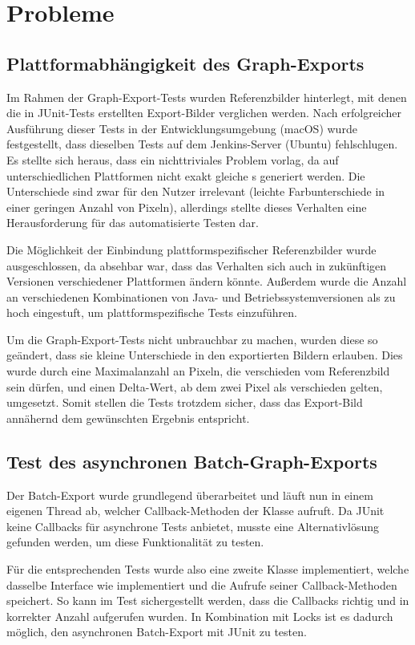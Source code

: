 \newpage
\section{Probleme}

\subsection{Plattformabhängigkeit des Graph-Exports}

Im Rahmen der Graph-Export-Tests wurden Referenzbilder hinterlegt, mit denen die in JUnit-Tests erstellten Export-Bilder verglichen werden.
Nach erfolgreicher Ausführung dieser Tests in der Entwicklungsumgebung (macOS) wurde festgestellt, dass dieselben Tests auf dem Jenkins-Server (Ubuntu) fehlschlugen.
Es stellte sich heraus, dass ein nichttriviales Problem vorlag, da auf unterschiedlichen Plattformen nicht exakt gleiche s generiert werden.
Die Unterschiede sind zwar für den Nutzer irrelevant (leichte Farbunterschiede in einer geringen Anzahl von Pixeln), allerdings stellte dieses Verhalten eine Herausforderung für das automatisierte Testen dar.

Die Möglichkeit der Einbindung plattformspezifischer Referenzbilder wurde ausgeschlossen, da absehbar war, dass das Verhalten sich auch in zukünftigen Versionen verschiedener Plattformen ändern könnte.
Außerdem wurde die Anzahl an verschiedenen Kombinationen von Java- und Betriebssystemversionen als zu hoch eingestuft, um plattformspezifische Tests einzuführen.

Um die Graph-Export-Tests nicht unbrauchbar zu machen, wurden diese so geändert, dass sie kleine Unterschiede in den exportierten Bildern erlauben.
Dies wurde durch eine Maximalanzahl an Pixeln, die verschieden vom Referenzbild sein dürfen, und einen Delta-Wert, ab dem zwei Pixel als verschieden gelten, umgesetzt.
Somit stellen die Tests trotzdem sicher, dass das Export-Bild annähernd dem gewünschten Ergebnis entspricht.

\subsection{Test des asynchronen Batch-Graph-Exports}

Der Batch-Export wurde grundlegend überarbeitet und läuft nun in einem eigenen Thread ab, welcher Callback-Methoden der Klasse  aufruft.
Da JUnit keine Callbacks für asynchrone Tests anbietet, musste eine Alternativlösung gefunden werden, um diese Funktionalität zu testen.

Für die entsprechenden Tests wurde also eine zweite Klasse implementiert, welche dasselbe Interface wie  implementiert und die Aufrufe seiner Callback-Methoden speichert.
So kann im Test sichergestellt werden, dass die Callbacks richtig und in korrekter Anzahl aufgerufen wurden.
In Kombination mit Locks ist es dadurch möglich, den asynchronen Batch-Export mit JUnit zu testen.
